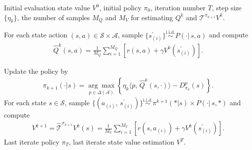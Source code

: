 \documentclass[10pt]{article}
\newcommand{\calA}{\mathcal{A}}
\newcommand{\calT}{\mathcal{T}}
\newcommand{\ls}{\left}
\newcommand{\rs}{\right}
\theoremstyle{plain}
\newtheorem{lemma}[theorem]{Lemma}
\theoremstyle{definition}
\begin{document}
\begin{algorithm}[ht!]
   \caption{Sample-based TD-PMD}
   \label{alg:sampling-TD-PMD}
\begin{algorithmic}
    Initial evaluation state value $V^0$, initial policy $\pi_0$, iteration number $T$, step size $\{ \eta_k \}$, the number of samples $M_Q$ and $M_V$ for estimating $Q^k$ and $\mathcal{T}^{\pi_{k+1}}V^k$.


   \vspace{0.2cm}
    For each state action $(s,a)\in \mathcal{S}\times\mathcal{A}$, sample $\{ s^\prime_{(i)} \} \stackrel{\mathrm{i.i.d.}}{\sim} P(\cdot|\,s,a)$ and compute
   \begin{align*}
 \widehat{Q}^k(s,a) = \frac{1}{M_Q} \sum_{i=1}^{M_Q} \ls[ r(s,a) + \gamma V^k(s^\prime_{(i)}) \rs].
   \end{align*}
 
   
   \vspace{0.2cm}

   Update the policy by
   \begin{align}
       \pi_{k+1}(\cdot|s) \!=\! \underset{p\in\Delta(\calA)}{\arg\max} \ls\{ \eta_k \langle p, \, \widehat{Q}^{k}(s,\cdot) \rangle \!-\! D^p_{\pi_k}(s) \rs\}.
       \label{eq:TD-PMD-policy-step-inexact}
   \end{align}
    For each state $s\in \mathcal{S}$, sample $\{ (a_{(i)}, \, s^\prime_{(i)}) \} \stackrel{\mathrm{i.i.d.}}{\sim} \pi^{k+1}(*|s) \times P(\cdot|\,s,*)$ and compute
    \begin{align*}
       V^{k+1}= \widehat{\calT}^{\pi_{k+1}} V^k(s) = \frac{1}{M_V} \sum_{i=1}^{M_V} \ls[ r(s,a_{(i)}) + \gamma V^k(s^\prime_{(i)}) \rs].
    \end{align*}
   \ENDFOR
    Last iterate policy $\pi_T$, last iterate state  value  estimation $V^T$.
\end{algorithmic}
\end{algorithm}
\end{document}
